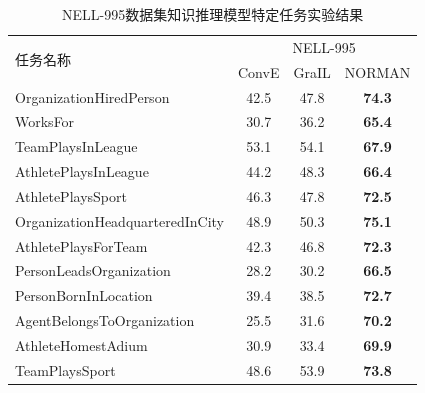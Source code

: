 \documentclass[algorithmlist, AutoFakeBold, AutoFakeSlant, figurelist, tablelist, nomlist, engineering]{seuthesix}
\begin{document}
\begin{table}[t]
  \centering
  \caption{NELL-995数据集知识推理模型特定任务实验结果}
  \begin{tabular*}{0.95\textwidth}{@{\extracolsep{\fill}}lccc}
    \toprule[1pt]
    \multirow{2}{*}{\small{任务名称}} & \multicolumn{3}{c}{\small{NELL-995}} \\
      & \small{ConvE} & \small{GraIL} & \small{NORMAN} \\ \hline
    \small{OrganizationHiredPerson} & 42.5 & 47.8 & \textbf{74.3} \\
    \small{WorksFor} & 30.7 & 36.2 & \textbf{65.4} \\
    \small{TeamPlaysInLeague} & 53.1 & 54.1 & \textbf{67.9} \\
    \small{AthletePlaysInLeague} & 44.2 & 48.3 & \textbf{66.4} \\
    \small{AthletePlaysSport} & 46.3 & 47.8 & \textbf{72.5} \\
    \small{OrganizationHeadquarteredInCity} & 48.9 & 50.3 & \textbf{75.1} \\
    \small{AthletePlaysForTeam} & 42.3 & 46.8 & \textbf{72.3} \\
    \small{PersonLeadsOrganization} & 28.2 & 30.2 & \textbf{66.5} \\
    \small{PersonBornInLocation} & 39.4 & 38.5 & \textbf{72.7} \\
    \small{AgentBelongsToOrganization} & 25.5 & 31.6 & \textbf{70.2} \\
    \small{AthleteHomestAdium} & 30.9 & 33.4 & \textbf{69.9} \\
    \small{TeamPlaysSport} & 48.6 & 53.9 & \textbf{73.8} \\
    \bottomrule[1pt]
  \end{tabular*}
  \label{Experiment1_tasks2}
\end{table}

\end{document}
